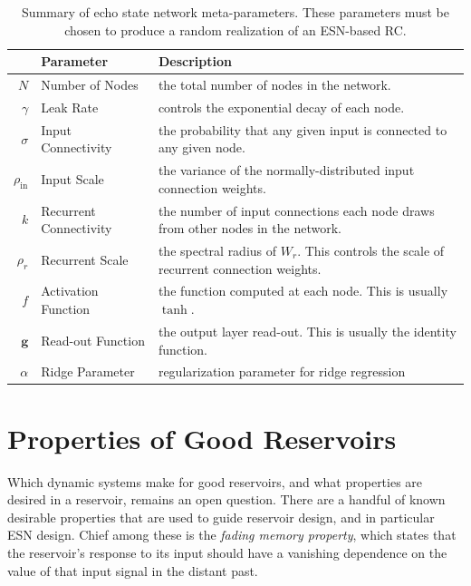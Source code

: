 \begin{table}
  \caption{Summary of echo state network meta-parameters. These
    parameters must be chosen to produce a random realization of an
    ESN-based RC.}
  \begin{tabularx}{\linewidth}{rlX}
    & Parameter & Description \\
    \hline
    \rule{0pt}{4ex}
    $N$ & Number of Nodes & the total number of nodes in the network. \\
    \rule{0pt}{4ex}
    $\gamma$ & Leak Rate & controls the exponential decay of each node. \\
    \rule{0pt}{4ex}
    $\sigma$ & Input Connectivity & the probability that any given input is connected to any given node. \\
    \rule{0pt}{4ex}
    $\rho_\text{in}$ & Input Scale & the variance of the normally-distributed input connection weights. \\
    \rule{0pt}{4ex}
    $k$ & Recurrent Connectivity & the number of input connections each node draws from other nodes in the network. \\
    \rule{0pt}{4ex}
    $\rho_r$ & Recurrent Scale & the spectral radius of $W_r$. This controls the scale of recurrent connection weights. \\
    \rule{0pt}{4ex}
    $f$ & Activation Function & the function computed at each node. This is usually $\tanh$. \\
    \rule{0pt}{4ex}
    $\bm{g}$ & Read-out Function & the output layer read-out. This is usually the identity function. \\
    \rule{0pt}{4ex}
    $\alpha$ & Ridge Parameter & regularization parameter for ridge regression \\
  \end{tabularx}
  \label{tab:esn-metaparameters}
\end{table}

\section{Properties of Good Reservoirs}\label{sec:reservoir-properties}

Which dynamic systems make for good reservoirs, and what properties
are desired in a reservoir, remains an open question. There are a
handful of known desirable properties that are used to guide reservoir
design, and in particular ESN design. Chief among these is the
\emph{fading memory property}, which states that the reservoir's
response to its input should have a vanishing dependence on the value
of that input signal in the distant past.~\cite{jaeger2001,jaeger2002}

